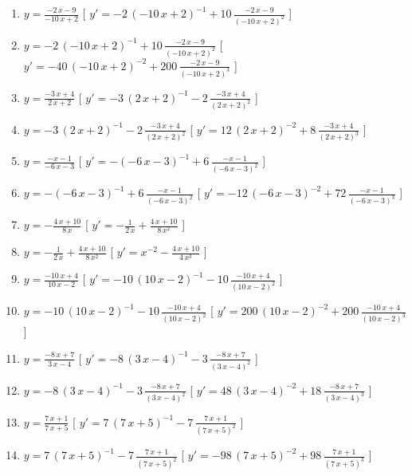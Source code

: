 \begin{esercizio}
\begin{enumerate}
\item $y= {\frac {-2\,x-9}{-10\,x+2}} $ \hfill [ $y'= -2\, \left( -10\,x+2 \right) ^{-1}+10\,{\frac {-2\,x-9}{ \left( -10\,x+2 \right) ^{2}}}$ ]
\item $y= -2\, \left( -10\,x+2 \right) ^{-1}+10\,{\frac {-2\,x-9}{ \left( -10\,x+2 \right) ^{2}}} $ \hfill [ $y'= -40\, \left( -10\,x+2 \right) ^{-2}+200\,{\frac {-2\,x-9}{ \left( -10\,x+2 \right) ^{3}}}$ ]
\item $y= {\frac {-3\,x+4}{2\,x+2}} $ \hfill [ $y'= -3\, \left( 2\,x+2 \right) ^{-1}-2\,{\frac {-3\,x+4}{ \left( 2\,x+2 \right) ^{2}}}$ ]
\item $y= -3\, \left( 2\,x+2 \right) ^{-1}-2\,{\frac {-3\,x+4}{ \left( 2\,x+2 \right) ^{2}}} $ \hfill [ $y'= 12\, \left( 2\,x+2 \right) ^{-2}+8\,{\frac {-3\,x+4}{ \left( 2\,x+2 \right) ^{3}}}$ ]
\item $y= {\frac {-x-1}{-6\,x-3}} $ \hfill [ $y'= - \left( -6\,x-3 \right) ^{-1}+6\,{\frac {-x-1}{ \left( -6\,x-3 \right) ^{2}}}$ ]
\item $y= - \left( -6\,x-3 \right) ^{-1}+6\,{\frac {-x-1}{ \left( -6\,x-3 \right) ^{2}}} $ \hfill [ $y'= -12\, \left( -6\,x-3 \right) ^{-2}+72\,{\frac {-x-1}{ \left( -6\,x-3 \right) ^{3}}}$ ]
\item $y= -{\frac {4\,x+10}{8\,x}} $ \hfill [ $y'= -{\frac {1}{2\,x}}+{\frac {4\,x+10}{8\,{x}^{2}}}$ ]
\item $y= -{\frac {1}{2\,x}}+{\frac {4\,x+10}{8\,{x}^{2}}} $ \hfill [ $y'= {x}^{-2}-{\frac {4\,x+10}{4\,{x}^{3}}}$ ]
\item $y= {\frac {-10\,x+4}{10\,x-2}} $ \hfill [ $y'= -10\, \left( 10\,x-2 \right) ^{-1}-10\,{\frac {-10\,x+4}{ \left( 10\,x-2 \right) ^{2}}}$ ]
\item $y= -10\, \left( 10\,x-2 \right) ^{-1}-10\,{\frac {-10\,x+4}{ \left( 10\,x-2 \right) ^{2}}} $ \hfill [ $y'= 200\, \left( 10\,x-2 \right) ^{-2}+200\,{\frac {-10\,x+4}{ \left( 10\,x-2 \right) ^{3}}}$ ]
\item $y= {\frac {-8\,x+7}{3\,x-4}} $ \hfill [ $y'= -8\, \left( 3\,x-4 \right) ^{-1}-3\,{\frac {-8\,x+7}{ \left( 3\,x-4 \right) ^{2}}}$ ]
\item $y= -8\, \left( 3\,x-4 \right) ^{-1}-3\,{\frac {-8\,x+7}{ \left( 3\,x-4 \right) ^{2}}} $ \hfill [ $y'= 48\, \left( 3\,x-4 \right) ^{-2}+18\,{\frac {-8\,x+7}{ \left( 3\,x-4 \right) ^{3}}}$ ]
\item $y= {\frac {7\,x+1}{7\,x+5}} $ \hfill [ $y'= 7\, \left( 7\,x+5 \right) ^{-1}-7\,{\frac {7\,x+1}{ \left( 7\,x+5 \right) ^{2}}}$ ]
\item $y= 7\, \left( 7\,x+5 \right) ^{-1}-7\,{\frac {7\,x+1}{ \left( 7\,x+5 \right) ^{2}}} $ \hfill [ $y'= -98\, \left( 7\,x+5 \right) ^{-2}+98\,{\frac {7\,x+1}{ \left( 7\,x+5 \right) ^{3}}}$ ]

\end{enumerate}
\end{esercizio}
